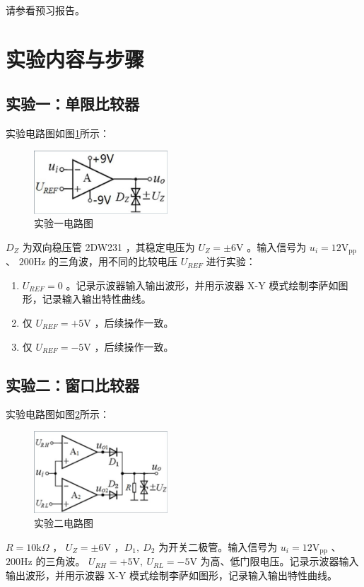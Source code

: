 \documentclass[a4paper,11pt,UTF8]{ctexart}
\newcommand\mr[1]{\mathrm{#1}}
\begin{document}
请参看预习报告。

\section{实验内容与步骤}
\subsection{实验一：单限比较器}
	实验电路图如图\ref{fig:Exp01}所示：
	\begin{figure}[H]
	 \centering
	 \includegraphics[width=5cm]{Exp01}
	 \caption{实验一电路图}
	 \label{fig:Exp01}
	\end{figure}
	$D_Z$ 为双向稳压管 2DW231 ，其稳定电压为 $U_Z=\pm 6\mr{V}$ 。输入信号为 $u_i=12\mr{V_{pp}}$ 、 $200\mr{Hz}$ 的三角波，用不同的比较电压 $U_{REF}$ 进行实验：
	\begin{enumerate}
	 \item $U_{REF}=0$ 。记录示波器输入输出波形，并用示波器 X-Y 模式绘制李萨如图形，记录输入输出特性曲线。
	 \item 仅 $U_{REF}=+5\mr{V}$ ，后续操作一致。
	 \item 仅 $U_{REF}=-5\mr{V}$ ，后续操作一致。
	\end{enumerate}
\subsection{实验二：窗口比较器}
	实验电路图如图\ref{fig:Exp02}所示：
	\begin{figure}[H]
	 \centering
	 \includegraphics[width=5cm]{Exp02}
	 \caption{实验二电路图}
	 \label{fig:Exp02}
	\end{figure}
	$R=10\mr{k}\Omega$ ， $U_Z=\pm 6\mr{V}$ ，$D_1,~D_2$ 为开关二极管。输入信号为 $u_i=12\mr{V_{pp}}$ 、 $200\mr{Hz}$ 的三角波。  $U_{RH}=+5\mr{V},~U_{RL}=-5\mr{V}$ 为高、低门限电压。记录示波器输入输出波形，并用示波器 X-Y 模式绘制李萨如图形，记录输入输出特性曲线。
\end{document}
